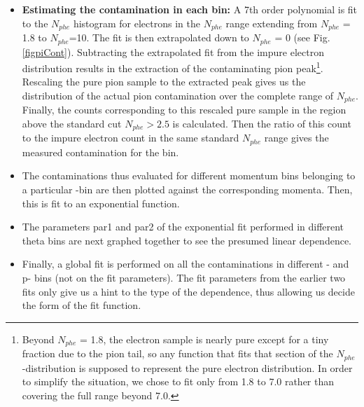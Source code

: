 \begin{itemize}
 
 \item {\bf Estimating the contamination in each bin:} %
 A 7th order polynomial is fit to the $N_{phe}$ histogram for electrons in the $N_{phe}$ range extending from $N_{phe}$ = 1.8 %
  to $N_{phe}$=10.  The fit is then extrapolated down to $N_{phe}$ = 0 (see Fig. \ref{figpiCont}). Subtracting the extrapolated fit from the impure electron distribution results in the extraction of the contaminating pion peak\footnote{Beyond $N_{phe}$ = 1.8, the electron sample is nearly pure except for a tiny fraction due to the pion tail, so any function that fits that section of the $N_{phe}$-distribution is supposed to represent the pure electron distribution. In order to simplify the situation, we chose to fit only from 1.8 to 7.0 %
  rather than covering the full range beyond 7.0.}. Rescaling the pure pion sample to the extracted peak gives us the distribution of the actual pion contamination over the complete range of $N_{phe}$. Finally, the counts corresponding to this rescaled pure sample in the region above the standard cut $N_{phe}>2.5$ is calculated. %
 Then the ratio of this count to the impure electron count in the same standard $N_{phe}$ range gives the measured contamination for the bin.
 \item The contaminations thus evaluated for different momentum bins belonging to a particular \thns-bin are then plotted against the corresponding momenta. Then, this is fit to an exponential function.
 \item The parameters par1 and par2 of the exponential fit performed in different theta bins are next graphed together to see the presumed linear dependence.
 \item Finally, a global fit is performed on all the contaminations in different \thns- and p- bins (not on the fit parameters). The fit parameters from the earlier two fits only give us a hint to the type of the dependence, thus allowing us decide the form of the fit function.
\end{itemize}








